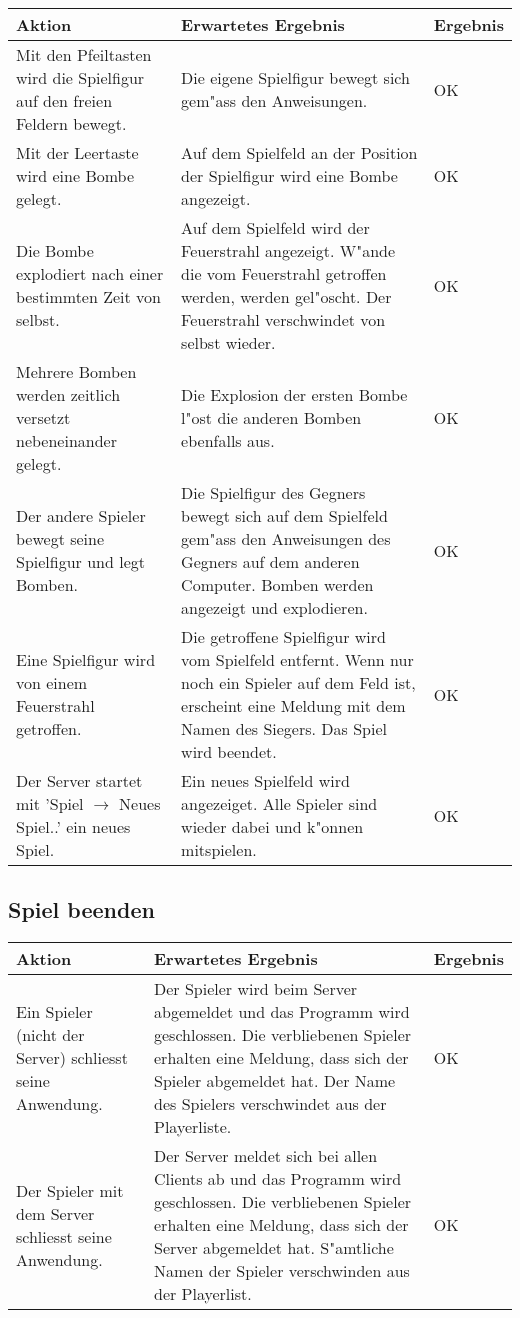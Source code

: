 \begin{tabular}{|p{50mm}|p{70mm}|p{20mm}|}
\hline
\textbf{Aktion} & \textbf{Erwartetes Ergebnis} & \textbf{Ergebnis}  \\

\hline
Mit den Pfeiltasten wird die Spielfigur auf den freien Feldern bewegt.  &
Die eigene Spielfigur bewegt sich gem"ass den Anweisungen.  &
OK  \\
\hline
Mit der Leertaste wird eine Bombe gelegt.  &
Auf dem Spielfeld an der Position der Spielfigur wird eine Bombe angezeigt. &
OK  \\
\hline
Die Bombe explodiert nach einer bestimmten Zeit von selbst.  &
Auf dem Spielfeld wird der Feuerstrahl angezeigt. W"ande die vom Feuerstrahl getroffen werden, werden
  gel"oscht. Der Feuerstrahl verschwindet von selbst wieder.  &
OK  \\
\hline
Mehrere Bomben werden zeitlich versetzt nebeneinander gelegt.  &
Die Explosion der ersten Bombe l"ost die anderen Bomben ebenfalls aus.  &
OK  \\
\hline
Der andere Spieler bewegt seine Spielfigur und legt Bomben.  &
Die Spielfigur des Gegners bewegt sich auf dem Spielfeld gem"ass den Anweisungen des Gegners auf dem anderen
  Computer. Bomben werden angezeigt und explodieren. &
OK  \\
\hline
Eine Spielfigur wird von einem Feuerstrahl getroffen.  &
Die getroffene Spielfigur wird vom Spielfeld entfernt. Wenn nur noch ein Spieler auf dem Feld ist, erscheint
  eine Meldung mit dem Namen des Siegers. Das Spiel wird beendet. &
OK  \\
\hline
Der Server startet mit 'Spiel $\rightarrow$ Neues Spiel..' ein neues Spiel.  &
Ein neues Spielfeld wird angezeiget. Alle Spieler sind wieder dabei und k"onnen mitspielen.  &
OK  \\
\hline
\end{tabular}


\subsection{Spiel beenden}

\begin{tabular}{|p{50mm}|p{70mm}|p{20mm}|}
\hline
\textbf{Aktion} & \textbf{Erwartetes Ergebnis} & \textbf{Ergebnis}  \\
\hline
Ein Spieler (nicht der Server) schliesst seine Anwendung.  &
Der Spieler wird beim Server abgemeldet und das Programm wird geschlossen. Die verbliebenen Spieler
  erhalten eine Meldung, dass sich der Spieler abgemeldet hat. Der Name des Spielers verschwindet aus
  der Playerliste.  &
OK  \\
\hline
Der Spieler mit dem Server schliesst seine Anwendung.  &
Der Server meldet sich bei allen Clients ab und das Programm wird geschlossen. Die verbliebenen Spieler
  erhalten eine Meldung, dass sich der Server abgemeldet hat. S"amtliche Namen der Spieler verschwinden
  aus der Playerlist.  &
OK  \\
\hline
\end{tabular}



